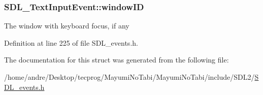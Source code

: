 \hypertarget{struct_s_d_l___text_input_event_aeb4f7a939353990ca40261ffbfbeb3d0}{
\subsubsection[{window\-I\-D}]{ S\-D\-L\-\_\-\-Text\-Input\-Event\-::window\-I\-D}}\label{struct_s_d_l___text_input_event_aeb4f7a939353990ca40261ffbfbeb3d0}
The window with keyboard focus, if any 

Definition at line 225 of file S\-D\-L\-\_\-events.\-h.



The documentation for this struct was generated from the following file\-:\begin{DoxyCompactItemize}
\item 
/home/andre/\-Desktop/tecprog/\-Mayumi\-No\-Tabi/\-Mayumi\-No\-Tabi/include/\-S\-D\-L2/\hyperlink{_s_d_l__events_8h}{S\-D\-L\-\_\-events.\-h}\end{DoxyCompactItemize}
